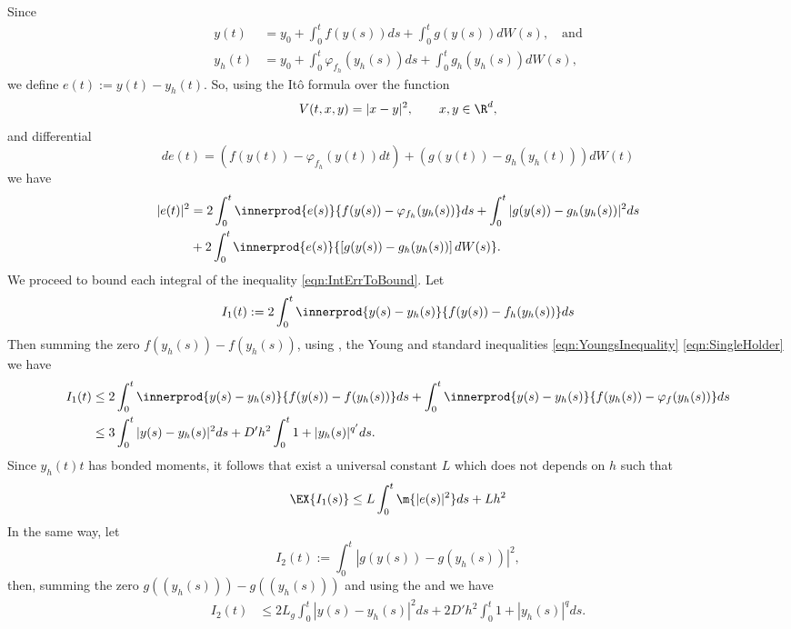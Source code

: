 \begin{pf}
	Since
	\begin{align*}
		y(t) &= y_0 + \int_{0}^t f(y(s))ds + \int_{0}^t g(y(s))dW(s), \quad \text{and} \\
		y_h(t) &= y_0 + \int_{0}^t \varphi_{f_h}(y_h(s))ds + \int_{0}^t g_h(y_h(s))dW(s),
	\end{align*}
	we define $e(t):= y(t)-y_h(t)$. So, using the It\^{o} formula over the function
	$$
		V(t,x,y) = |x-y|^2, \qquad x,y\in \R^d,
	$$ 
	and  differential
	$$
		d e(t) = 
		\left(
			f(y(t)) - \varphi_{f_h}(y(t)) dt
		\right)
		+
		\left(
			g(y(t)) - g_h(y_h(t))
		\right) dW(t)
	$$
	we have
	\begin{align} \label{eqn:IntErrToBound}
		|e(t)|^2 
		&=
			2 \int_{0}^t
				\innerprod{e(s)}{f(y(s))-\varphi_{f_h}(y_h(s))} ds 
			+
			\int_{0}^t
				|g(y(s)) - g_h(y_h(s))|^2 ds\notag\\
		&+
			2 \int_{0}^t
				\innerprod{e(s)}{\left[ g(y(s))-g_h(y_h(s)) \right] dW(s)}.
	\end{align}
	We proceed to bound each integral of the inequality \eqref{eqn:IntErrToBound}.
	Let 
	$$
		I_1(t):= 
			2\int_{0}^t
				\innerprod{y(s) - y_h(s)}{f(y(s)) - f_h(y_h(s))}ds			
	$$
	Then summing the zero $f(y_h(s))-f(y_h(s))$, using , the Young and  standard 
	inequalities \eqref{eqn:YoungsInequality} \eqref{eqn:SingleHolder} we have
	\begin{align*}
		I_1(t) 
		&\leq
			2\int_0^t
				\innerprod{y(s) - y_h(s)}{f(y(s))-f(y_h(s))} ds
			+
			 \int_0^t
				 \innerprod{y(s) - y_h(s)}{f(y_h(s))-\varphi_{f}(y_h(s))} ds \notag\\
%	
		&\leq
			3\int_0^t
				|y(s) - y_h(s)|^2ds
			+ D' h^2 
			\int_0^t
				1 + |y_h(s)|^{q'} ds.
	\end{align*}
	Since $y_h(t)t$ has bonded moments, it follows that exist a universal constant $L$ which does not depends on $h$ 
	such that
	\begin{equation}\label{eqn:I1Bound} 
		 \EX{
			 I_1(s)	
		 }
		 \leq
			 L\int_{0}^t
				\m{|e(s)|^2} ds
		+ L h^2
	 \end{equation}
	In the same way, let
	$$
		I_2(t):= 
			\int_{0}^t
				\left|
					g(y(s)) - g(y_h(s))
				\right|^2,
	$$ 
	then, summing the zero $g((y_h(s)))-g((y_h(s)))$ and using the  and 
	 we have
	\begin{align*}
		I_2(t) 
		&\leq
			2 L_g 
			\int_{0}^t
				|y(s) - y_h(s)|^2 ds
			+
			2D'h^2
			\int_0^t
				1 + |y_h(s)|^q ds. 	 

\end{align*}
\end{pf}
